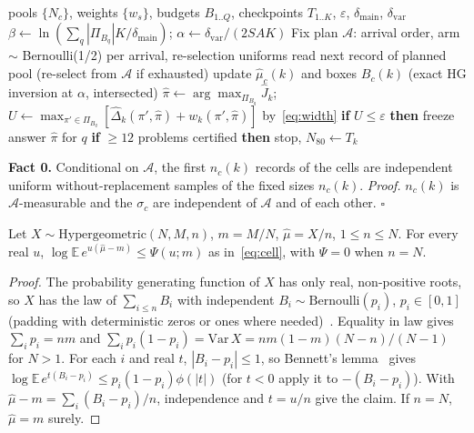 \documentclass[sigconf,anonymous,review]{acmart}
\newcommand{\cA}{\mathcal{A}}
\newcommand{\eps}{\varepsilon}
\newcommand{\dmain}{\delta_{\text{main}}}
\newcommand{\dvar}{\delta_{\text{var}}}
\begin{document}
\begin{algorithm}[H]
\caption{FDC-BF (stop at 12/15; omit line 10 for the full-horizon window).}
\label{alg:fdcbf}
\small
\begin{algorithmic}[1]
\Require pools $\{N_c\}$, weights $\{w_s\}$, budgets $B_{1..Q}$, checkpoints $T_{1..K}$, $\eps$, $\dmain$, $\dvar$
\State $\beta \gets \ln(\sum_q |\Pi_{B_q}| K/\dmain)$; $\alpha \gets \dvar/(2SAK)$
\State Fix plan $\cA$: arrival order, arm $\sim$ Bernoulli(1/2) per arrival, re-selection uniforms
  \State read next record of planned pool (re-select from $\cA$ if exhausted)
    \State update $\hat\mu_c(k)$ and boxes $B_c(k)$ (exact HG inversion at $\alpha$, intersected)
      \State $\hat\pi \gets \arg\max_{\Pi_{B_q}} \hat J_k$; $U \gets \max_{\pi'\in\Pi_{B_q}} [\hat\Delta_k(\pi',\hat\pi) + w_k(\pi',\hat\pi)]$ by~\eqref{eq:width}
      \State \textbf{if} $U \le \eps$ \textbf{then} freeze answer $\hat\pi$ for $q$
    \EndFor
    \State \textbf{if} $\ge 12$ problems certified \textbf{then} stop, $N_{80} \gets T_k$
  \EndIf
\EndFor
\end{algorithmic}
\end{algorithm}

\textbf{Fact 0.} Conditional on $\cA$, the first $n_c(k)$ records of the cells are independent uniform without-replacement samples of the fixed sizes $n_c(k)$. \emph{Proof.} $n_c(k)$ is $\cA$-measurable and the $\sigma_c$ are independent of $\cA$ and of each other. $\square$

\begin{lemma}\label{lem:bennett}
Let $X \sim \mathrm{Hypergeometric}(N, M, n)$, $m = M/N$, $\hat\mu = X/n$, $1 \le n \le N$. For every real $u$, $\log \mathbb{E}\, e^{u(\hat\mu - m)} \le \Psi(u; m)$ as in~\eqref{eq:cell}, with $\Psi = 0$ when $n = N$.
\end{lemma}
\begin{proof}
The probability generating function of $X$ has only real, non-positive roots, so $X$ has the law of $\sum_{i \le n} B_i$ with independent $B_i \sim \mathrm{Bernoulli}(p_i)$, $p_i \in [0,1]$ (padding with deterministic zeros or ones where needed)~\citep{vatutin1982limit,tang2023poisson}. Equality in law gives $\sum_i p_i = nm$ and $\sum_i p_i(1-p_i) = \mathrm{Var}\,X = n m(1-m)(N-n)/(N-1)$ for $N > 1$. For each $i$ and real $t$, $|B_i - p_i| \le 1$, so Bennett's lemma~\citep{bennett1962probability} gives $\log \mathbb{E}\, e^{t(B_i - p_i)} \le p_i(1-p_i)\phi(|t|)$ (for $t < 0$ apply it to $-(B_i - p_i)$). With $\hat\mu - m = \sum_i (B_i - p_i)/n$, independence and $t = u/n$ give the claim. If $n = N$, $\hat\mu = m$ surely.
\end{proof}
\end{document}
